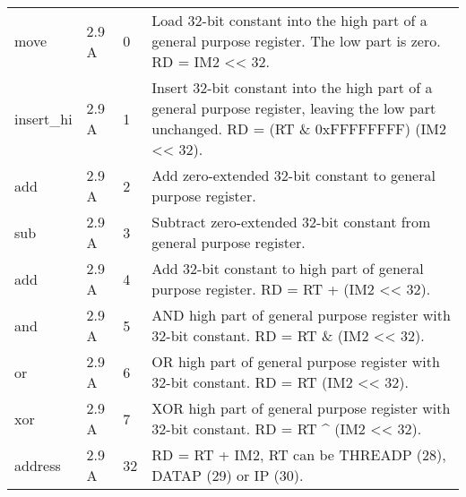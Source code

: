 \documentclass[forwardcom.tex]{subfiles}
\begin{document}
\begin{longtable} {|p{25mm}|p{14mm}|p{10mm}|p{95mm}|}
move          & 2.9 A &  0  & Load 32-bit constant into the high part of a general purpose register. The low part is zero. RD = IM2 \textless\textless{} 32. \\
insert\_hi    & 2.9 A &  1  & Insert 32-bit constant into the high part of a general purpose register, leaving the low part unchanged.
RD = (RT \& 0xFFFFFFFF) \textbar{} (IM2 \textless\textless{} 32). \\
add           & 2.9 A &  2  & Add zero-extended 32-bit constant to general purpose register. \\
sub           & 2.9 A &  3  & Subtract zero-extended 32-bit constant from general purpose register. \\
add           & 2.9 A &  4  & Add 32-bit constant to high part of general purpose register. RD = RT + (IM2 \textless\textless{} 32). \\
and           & 2.9 A &  5  & AND high part of general purpose register with 32-bit constant. RD = RT \& (IM2 \textless\textless{} 32). \\
or            & 2.9 A &  6  & OR high part of general purpose register with 32-bit constant. RD = RT \textbar{} (IM2 \textless\textless{} 32). \\
xor           & 2.9 A &  7  & XOR high part of general purpose register with 32-bit constant. RD = RT \^{} (IM2 \textless\textless{} 32). \\
address       & 2.9 A & 32  & RD = RT + IM2, RT can be THREADP (28), DATAP (29) or IP (30). \\
\hline
\end{longtable}
\end{document}
